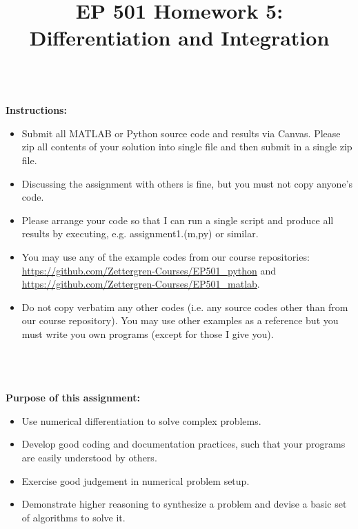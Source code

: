\documentclass{article}
\begin{document}
\title{EP 501 Homework 5:  Differentiation and Integration}

\maketitle

~\\
\textbf{Instructions:}  
\begin{itemize}
  \item Submit all MATLAB or Python source code and results via Canvas.  Please zip all contents of your solution into single file and then submit in a single zip file.    
  \item Discussing the assignment with others is fine, but you must not copy anyone's code.  
  \item Please arrange your code so that I can run a single script and produce all results by executing, e.g. \textsf{assignment1.(m,py)} or similar.  
  \item You may use any of the example codes from our course repositories:  \url{https://github.com/Zettergren-Courses/EP501_python} and \url{https://github.com/Zettergren-Courses/EP501_matlab}.
  \item Do not copy verbatim any other codes (i.e. any source codes other than from our course repository).  You may use other examples as a reference but you must write you own programs (except for those I give you).  

\end{itemize}
~\\~\\~\\
\textbf{Purpose of this assignment:}  
\begin{itemize}
  \item Use numerical differentiation to solve complex problems.  
  \item Develop good coding and documentation practices, such that your programs are easily understood by others.  
  \item Exercise good judgement in numerical problem setup.
  \item Demonstrate higher reasoning to synthesize a problem and devise a basic set of algorithms to solve it.  
\end{itemize}

\pagebreak
\end{document}
